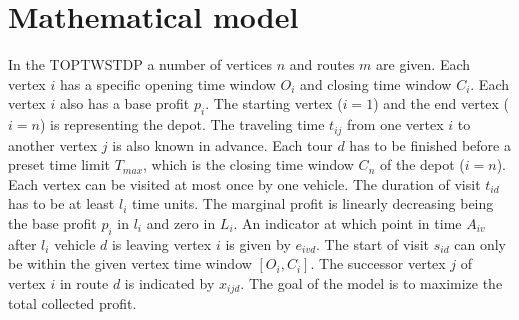 \documentclass[final,5p,times,twocolumn]{elsarticle}
\begin{document}
\section{Mathematical model}
\setcounter{equation}{-1}
In the TOPTWSTDP a number of vertices $n$ and routes $m$ are given. Each vertex $i$ has a specific opening time window $O_{i}$ and closing time window $C_{i}$. Each vertex $i$ also has a base profit $p_{i}$. The starting vertex ($i=1$) and the end vertex ($i=n$) is representing the depot. The traveling time $t_{ij}$ from one vertex $i$ to another vertex $j$ is also known in advance. Each tour $d$ has to be finished before a preset time limit $T_{max}$, which is the closing time window $C_{n}$ of the depot ($i=n$). Each vertex can be visited at most once by one vehicle. The duration of visit $t_{id}$ has to be at least $l_{i}$ time units. The marginal profit is linearly decreasing being the base profit $p_{i}$ in $l_{i}$ and zero in $L_{i}$. An indicator at which point in time $A_{iv}$ after $l_{i}$ vehicle $d$ is leaving vertex $i$ is given by $e_{ivd}$. The start of visit $s_{id}$ can only be within the given vertex time window $[O_{i},C_{i}]$. The successor vertex $j$ of vertex $i$ in route $d$ is indicated by $x_{ijd}$.  The goal of the model is to maximize the total collected profit.
\allowdisplaybreaks
\end{document}
